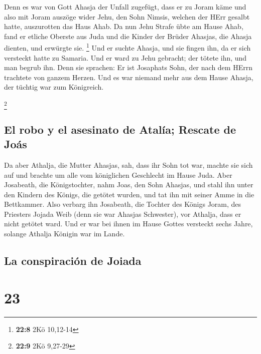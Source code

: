 Denn es war von Gott Ahasja der Unfall zugefügt, dass er
zu Joram käme und also mit Joram auszöge wider Jehu, den Sohn Nimsis,
welchen der HErr gesalbt hatte, auszurotten das Haus Ahab.
 Da nun Jehu Strafe übte am Hause Ahab, fand er etliche
Oberste aus Juda und die Kinder der Brüder Ahasjas, die Ahasja dienten,
und erwürgte sie. \footnote{\textbf{22:8} 2Kö 10,12-14} 
Und er suchte Ahasja, und sie fingen ihn, da er sich versteckt hatte zu
Samaria. Und er ward zu Jehu gebracht; der tötete ihn, und man begrub
ihn. Denn sie sprachen: Er ist Josaphats Sohn, der nach dem HErrn
trachtete von ganzem Herzen. Und es war niemand mehr aus dem Hause
Ahasja, der tüchtig war zum Königreich.

\footnote{\textbf{22:9} 2Kö 9,27-29}

\hypertarget{el-robo-y-el-asesinato-de-ataluxeda-rescate-de-jouxe1s}{%
\subsection{El robo y el asesinato de Atalía; Rescate de
Joás}\label{el-robo-y-el-asesinato-de-ataluxeda-rescate-de-jouxe1s}}

 Da aber Athalja, die Mutter Ahasjas, sah, dass ihr Sohn
tot war, machte sie sich auf und brachte um alle vom königlichen
Geschlecht im Hause Juda.  Aber Josabeath, die
Königstochter, nahm Joas, den Sohn Ahasjas, und stahl ihn unter den
Kindern des Königs, die getötet wurden, und tat ihn mit seiner Amme in
die Bettkammer. Also verbarg ihn Josabeath, die Tochter des Königs
Joram, des Priesters Jojada Weib (denn sie war Ahasjas Schwester), vor
Athalja, dass er nicht getötet ward.  Und er war bei
ihnen im Hause Gottes versteckt sechs Jahre, solange Athalja Königin war
im Lande.

\hypertarget{la-conspiraciuxf3n-de-joiada}{%
\subsection{La conspiración de
Joiada}\label{la-conspiraciuxf3n-de-joiada}}

\hypertarget{section-22}{%
\section{23}\label{section-22}}

